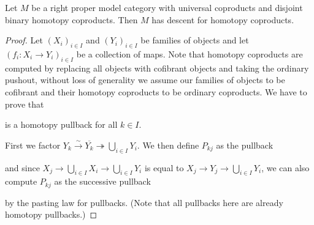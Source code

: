 \begin{corollary}\label{cor:disjointImpliesDescent}
    Let $M$ be a right proper model category with universal coproducts and disjoint binary homotopy coproducts.
    Then $M$ has descent for homotopy coproducts.
    \begin{proof}
        Let $\left(X_i\right)_{i\in I}$ and $\left(Y_i\right)_{i\in I}$ be families of objects and let $\left(f_i\colon X_i\to Y_i\right)_{i\in I}$ be a collection of maps.
        Note that homotopy coproducts are computed by replacing all objects with cofibrant objects and taking the ordinary pushout, without loss of generality we assume our families of objects to be cofibrant and their homotopy coproducts to be ordinary coproducts.
        We have to prove that 
        \begin{center}
        \end{center}
        is a homotopy pullback for all $k\in I$.
        
        First we factor $Y_k\xrightarrow{\sim}\overline{Y_k}\twoheadrightarrow\bigcup\limits_{i\in I}Y_i$.
        We then define $P_{kj}$ as the pullback
        \begin{center}
        \end{center}
        and since $X_j\to\bigcup\limits_{i\in I}X_i\to\bigcup\limits_{i\in I}Y_i$ is equal to $X_j\to Y_j\to\bigcup\limits_{i\in I}Y_i$, we can also compute $P_{kj}$ as the successive pullback
        \begin{center}%
        \end{center}
        by the pasting law for pullbacks.
        (Note that all pullbacks here are already homotopy pullbacks.)


\end{proof}
\end{corollary}
